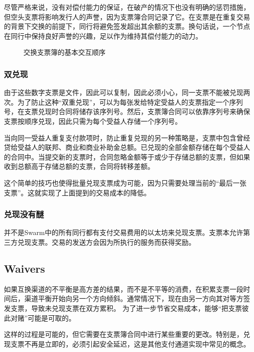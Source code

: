 尽管严格来说，没有对偿付能力的保证，在破产的情况下也没有明确的惩罚措施，但空头支票将影响发行人的声誉，因为支票簿合同记录了它。在支票是在重复交易的背景下交换的前提下，同行将避免签发超出其余额的支票。换句话说，一个节点在同行中保持良好声誉的兴趣，足以作为维持其偿付能力的动力。


\begin{figure}[htbp]
\centering

\caption[交换支票簿的基本交互序列\statusgreen]{交换支票簿的基本交互顺序}
\label{fig:swap-chequebook}
\end{figure}


\subsubsection{双兑现}

由于这些数字支票是文件，因此可以复制，因此必须小心，同一支票不能被兑现两次。为了防止这种“双重兑现”，可以为每张发给特定受益人的支票指定一个序列号，在支票兑现时合同将储存该序列号。然后，支票簿合同可以依靠序列号来确保支票按顺序兑现，因此只需为每个受益人存储一个序列号。

当向同一受益人重复支付款项时，防止重复兑现的另一种策略是，支票中包含曾经贷给受益人的联邦、商业和商业补助金总额。已兑现的全部金额存储在每个受益人的合同中。当提交新的支票时，合同忽略金额等于或少于存储总额的支票，但如果收到总额高于存储总额的支票，合同将转移差额。


这个简单的技巧也使得批量兑现支票成为可能，因为只需要处理当前的“最后一张支票”。这就实现了上面提到的交易成本的降低。

\subsubsection{兑现没有醚}\label{sec:zero_eth}
并不是Swarm中的所有同行都有支付交易费用的以太坊来兑现支票。支票本允许第三方兑现支票。交易的发送方会因为所执行的服务而获得奖励。

\subsection{Waivers\statusgreen}\label{sec:waiver}

如果互换渠道的不平衡是高方差的结果，而不是不平等的消费，在积累支票一段时间后，渠道平衡开始向另一个方向倾斜。通常情况下，现在由另一方向其对等方签发支票，导致未兑现支票在双方累积。
为了进一步节省交易成本，能够“把支票彼此对赌”可能是可取的。

这样的过程是可能的，但它需要在支票簿合同中进行某些重要的更改。特别是，兑现支票不再是立即的，必须引起安全延迟，这是其他支付通道实现中常见的概念。

